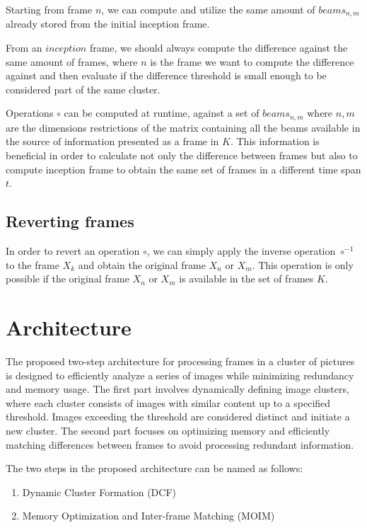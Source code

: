 \documentclass[twocolumn]{article}
\begin{document}
Starting from frame $n$, we can compute and utilize the same amount of $beams_{n,m}$ already stored from the initial inception frame. 

From an $inception$ frame, we should always compute the difference against the same amount of frames, where $n$ is the frame we want to compute the difference against and then evaluate if the difference threshold is small enough to be considered part of the same cluster.

Operations $\circ$ can be computed at runtime, against a set of $beams_{n,m}$ where $n,m$ are the dimensions restrictions of the matrix containing all the beams available in the source of information presented as a frame in $K$. This information is beneficial in order to calculate not only the difference between frames but also to compute inception frame to obtain the same set of frames in a different time span $t$.

\subsection{Reverting frames}
In order to revert an operation $\circ$, we can simply apply the inverse operation $\circ^{-1}$ to the frame $X_{k}$ and obtain the original frame $X_{n}$ or $X_{m}$. This operation is only possible if the original frame $X_{n}$ or $X_{m}$ is available in the set of frames $K$.

\section{Architecture}
The proposed two-step architecture for processing frames in a cluster of pictures is designed to efficiently analyze a series of images while minimizing redundancy and memory usage. The first part involves dynamically defining image clusters, where each cluster consists of images with similar content up to a specified threshold. Images exceeding the threshold are considered distinct and initiate a new cluster. The second part focuses on optimizing memory and efficiently matching differences between frames to avoid processing redundant information.

The two steps in the proposed architecture can be named as follows:

\begin{enumerate}
    \item Dynamic Cluster Formation (DCF)
    \item Memory Optimization and Inter-frame Matching (MOIM)
\end{enumerate}
\end{document}

